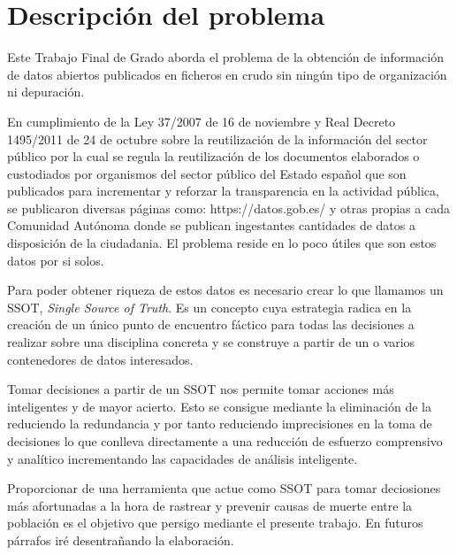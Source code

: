 \chapter{Descripción del problema}

Este Trabajo Final de Grado aborda el problema de la obtención de información de datos 
abiertos publicados en ficheros en crudo sin ningún tipo de organización ni depuración.

En cumplimiento de la Ley 37/2007 de 16 de noviembre y Real Decreto 1495/2011 de 24 de 
octubre sobre la reutilización de la información del sector público por la cual se regula 
la reutilización de los documentos elaborados o custodiados por organismos del sector 
público del Estado español que son publicados para incrementar y reforzar la 
transparencia en la actividad pública, se publicaron diversas páginas como: https://datos.gob.es/ 
y otras propias a cada Comunidad Autónoma donde se publican ingestantes cantidades de 
datos a disposición de la ciudadania. El problema reside en lo poco útiles que son 
estos datos por si solos. 

Para poder obtener riqueza de estos datos es necesario crear lo que 
llamamos un SSOT, \textit{Single Source of Truth}. Es un concepto cuya estrategia radica 
en la creación de un único punto de encuentro fáctico para todas las decisiones a 
realizar sobre una disciplina concreta y se construye a partir de un o varios contenedores 
de datos interesados.

Tomar decisiones a partir de un SSOT nos permite tomar acciones más inteligentes 
y de mayor acierto. Esto se consigue mediante la eliminación de la reduciendo la 
redundancia y por tanto reduciendo imprecisiones en la toma de decisiones lo que 
conlleva directamente a una reducción de esfuerzo comprensivo y analítico incrementando 
las capacidades de análisis inteligente. 

Proporcionar de una herramienta que actue como SSOT para tomar deciosiones 
más afortunadas a la hora de rastrear y prevenir causas de muerte entre la 
población es el objetivo que persigo mediante el presente trabajo. En futuros párrafos iré
desentrañando la elaboración.